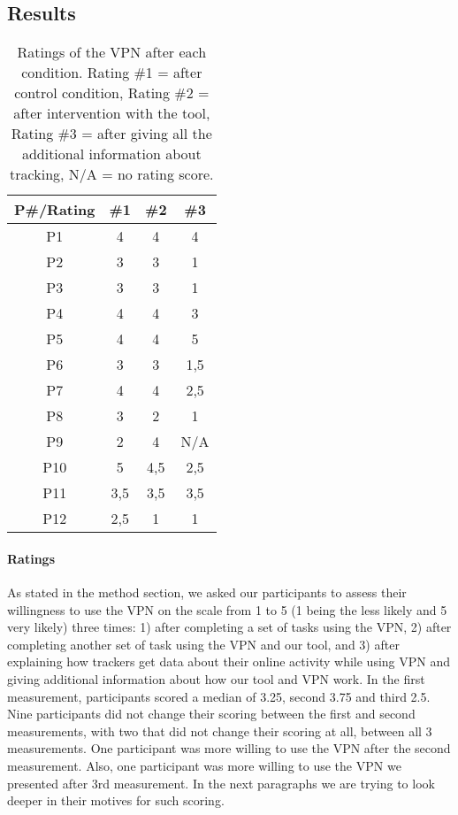 \subsection{Results}\label{sec:results}

\begin{table}[h!]
\centering
\begin{tabular}{|c c c c|} 
 \hline
P\#/Rating & \#1 & \#2 & \#3 \\
\hline
P1 & 4 & 4 & 4\\
P2 & 3 & 3 & 1\\
P3 & 3 & 3 & 1\\
P4 & 4 & 4 & 3\\
P5 & 4 & 4 & 5\\
P6 & 3 & 3 & 1,5\\
P7 & 4 & 4 & 2,5\\
P8 & 3 & 2 & 1\\
P9 & 2 & 4 & N/A\\
P10 & 5 & 4,5 & 2,5\\
P11 & 3,5 & 3,5 & 3,5\\
P12 & 2,5 & 1 & 1 \\
 \hline
\end{tabular}
\caption{Ratings of the VPN after each condition. Rating \#1 = after control condition, Rating \#2 = after intervention with the tool, Rating \#3 = after giving all the additional information about tracking, N/A = no rating score.}
\label{table:2}
\end{table}

\paragraph{Ratings}

As stated in the method section, we asked our participants to assess their
willingness to use the VPN on the scale from 1 to 5 (1 being the less likely
and 5 very likely) three times: 1) after completing a set of tasks using the
VPN, 2) after completing another set of task using the VPN and our tool, and
3) after explaining how trackers get data about their online activity
while using VPN and giving additional information about how our tool and VPN
work.  In the first measurement, participants scored a median of 3.25, second
3.75 and third 2.5. Nine participants did not change their scoring between the
first and second measurements, with two that did not change their scoring at
all, between all 3 measurements. One participant was more willing to use the
VPN after the second measurement. Also, one participant was more willing to
use the VPN we presented after 3rd measurement.  In the next paragraphs we are
trying to look deeper in their motives for such scoring.

